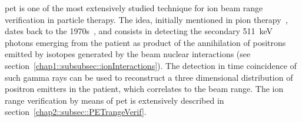 \gls{pet} is one of the most extensively studied technique for ion beam range verification in particle therapy. The idea, initially mentioned in pion therapy~\parencite{Goodman1986}, dates back to the 1970s~\parencite{Knopf2013, Bennett1975}, and consists in detecting the secondary 511~keV photons emerging from the patient as product of the annihilation of positrons emitted by isotopes generated by the beam nuclear interactions (see section~\ref{chap1::subsubsec::ionInteractions}). The detection in time coincidence of such gamma rays can be used to reconstruct a three dimensional distribution of positron emitters in the patient, which correlates to the beam range. The ion range verification by means of \gls{pet} is extensively described in section~\ref{chap2::subsec::PETrangeVerif}.
%
